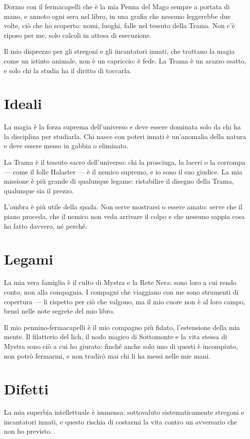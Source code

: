 \documentclass[letterpaper,twocolumn,openany,nodeprecatedcode,justified]{dndbook}
\begin{document}
Dormo con il fermacapelli che è la mia Penna del Mago sempre a portata di
mano, e annoto ogni sera nel libro, in una grafia che nessuno leggerebbe
due volte, ciò che ho scoperto: nomi, luoghi, falle nel tessuto della
Trama. Non c'è riposo per me, solo calcoli in attesa di esecuzione.

Il mio disprezzo per gli stregoni e gli incantatori innati, che trattano
la magia come un istinto animale, non è un capriccio: è fede. La Trama è
un arazzo esatto, e solo chi la studia ha il diritto di toccarla.

\section{Ideali}
La magia è la forza suprema dell'universo e deve essere dominata solo da
chi ha la disciplina per studiarla. Chi nasce con poteri innati è
un'anomalia della natura e deve essere messo in gabbia o eliminato.

La Trama è il tessuto sacro dell'universo: chi la prosciuga, la laceri o
la corrompa --- come il folle Halaster --- è il nemico supremo, e io sono
il suo giudice. La mia missione è più grande di qualunque legame: ristabilire
il disegno della Trama, qualunque sia il prezzo.

L'ombra è più utile della spada. Non serve mostrarsi o essere amato:
serve che il piano proceda, che il nemico non veda arrivare il colpo e
che nessuno sappia cosa ho fatto davvero, né perché.

\section{Legami}
La mia vera famiglia è il culto di Mystra e la Rete Nera: sono loro a
cui rendo conto, non alla compagnia. I compagni che viaggiano con me sono
strumenti di copertura --- li rispetto per ciò che valgono, ma il mio
cuore non è al loro campo, bensì nelle note segrete del mio libro.

Il mio pennino-fermacapelli è il mio compagno più fidato, l'estensione
della mia mente. Il filatterio del lich, il nodo magico di Sottomonte e
la vita stessa di Mystra sono ciò a cui ho giurato: finché anche solo uno
di questi è incompiuto, non potrò fermarmi, e non tradirò mai chi li ha
messi nelle mie mani.

\section{Difetti}
La mia superbia intellettuale è immensa: sottovaluto sistematicamente
stregoni e incantatori innati, e questo rischia di costarmi la vita contro
un avversario che non ho previsto.
\end{document}
